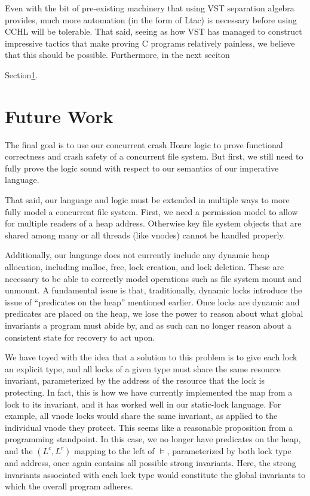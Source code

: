 Even with the bit of pre-existing machinery that using VST separation algebra
provides, much more automation (in the form of Ltac) is necessary before using
CCHL will be tolerable. That said, seeing as how VST has managed to construct
impressive tactics that make proving C programs relatively painless, we believe
that this should be possible. Furthermore, in the next seciton

Section\ref{sec:future}.


\section{Future Work}
\label{sec:future}


The final goal is to use our concurrent crash Hoare logic to prove
functional correctness and crash safety
of a concurrent file system.
But first,
we still need to fully prove the logic sound with respect to our
semantics of our imperative language.

That said, our language and logic must be extended in multiple ways to more
fully model a concurrent file system.
First, we need a
permission model to allow for multiple readers of a heap address.
Otherwise key file system objects that are shared among many or all
threads (like vnodes) cannot be handled properly.

Additionally, our language does not currently include any dynamic heap
allocation, including malloc, free, lock creation, and lock deletion.
These are
necessary to be able to correctly model operations such as file system mount and
unmount.
A fundamental issue is that, traditionally, dynamic locks introduce the
issue of ``predicates on the heap'' mentioned earlier.
Once locks are dynamic and
predicates are placed on the heap, we lose the power to reason about what global
invariants a program must abide by, and as such can no longer reason about a
consistent state for recovery to act upon.

We have toyed with the idea that a solution to this problem is to give each lock
an explicit type, and all locks of a given type must share the same resource
invariant, parameterized by the address of the resource that the lock is
protecting. In fact, this is how we have currently implemented the map from a
lock to its invariant, and it has worked well in our static-lock language.
For example, all vnode locks would share the same invariant, as
applied to the individual vnode they protect.
This seems like a reasonable proposition from a programming standpoint.
In this case, we no longer have predicates on the heap, and the
$(L^c,L^r)$ mapping to the left of $\vDash$, parameterized by both lock type and
address, once again contains all possible strong invariants.
Here, the strong
invariants associated with each lock type would constitute the global invariants
to which the overall program adheres.

